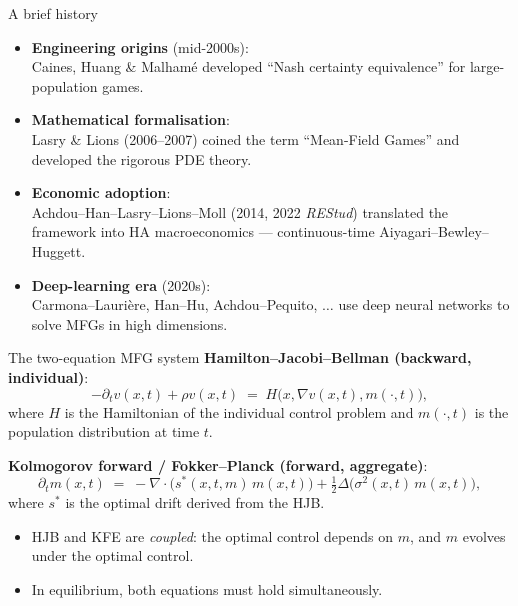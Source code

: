 \documentclass[10pt,english,aspectratio=169]{beamer}
\begin{document}
\begin{frame}{A brief history}
\begin{itemize}
\item \textbf{Engineering origins} (mid-2000s):\\
  Caines, Huang \& Malham\'e developed ``Nash certainty equivalence'' for large-population games.
\medskip
\item \textbf{Mathematical formalisation}:\\
  Lasry \& Lions (2006--2007) coined the term ``Mean-Field Games'' and developed the rigorous PDE theory.
\medskip
\item \textbf{Economic adoption}:\\
  Achdou--Han--Lasry--Lions--Moll (2014, 2022 \emph{REStud}) translated the framework into HA macroeconomics --- continuous-time Aiyagari--Bewley--Huggett.
\medskip
\item \textbf{Deep-learning era} (2020s):\\
  Carmona--Lauri\`ere, Han--Hu, Achdou--Pequito, $\ldots$ use deep neural networks to solve MFGs in high dimensions.
\end{itemize}
\end{frame}

\begin{frame}{The two-equation MFG system}
\textbf{Hamilton--Jacobi--Bellman (backward, individual)}:
\[
-\partial_t v(x,t) + \rho v(x,t) \;=\; H\!\big(x,\nabla v(x,t),m(\cdot,t)\big),
\]
where $H$ is the Hamiltonian of the individual control problem and $m(\cdot,t)$ is the population distribution at time $t$.
\medskip

\textbf{Kolmogorov forward / Fokker--Planck (forward, aggregate)}:
\[
\partial_t m(x,t) \;=\; -\nabla\!\cdot\!\big(s^*(x,t,m)\, m(x,t)\big) + \tfrac{1}{2}\Delta\!\big(\sigma^2(x,t)\,m(x,t)\big),
\]
where $s^*$ is the optimal drift derived from the HJB.
\medskip
\begin{itemize}
\item HJB and KFE are \emph{coupled}: the optimal control depends on $m$, and $m$ evolves under the optimal control.
\item In equilibrium, both equations must hold simultaneously.
\end{itemize}
\end{frame}
\end{document}

